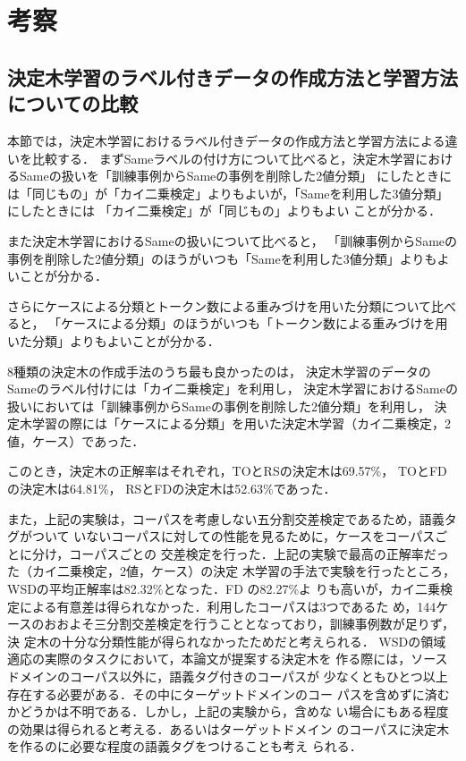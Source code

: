 \documentclass[japanese]{jnlp_1.4}
\begin{document}
\section{考察} \label{Sec:考察}

\subsection{決定木学習のラベル付きデータの作成方法と学習方法についての比較}

本節では，決定木学習におけるラベル付きデータの作成方法と学習方法による違いを比較する．
まずSameラベルの付け方について比べると，決定木学習におけるSameの扱いを「訓練事例からSameの事例を削除した2値分類」
にしたときには「同じもの」が「カイ二乗検定」よりもよいが，「Sameを利用した3値分類」にしたときには
「カイ二乗検定」が「同じもの」よりもよい
ことが分かる．


また決定木学習におけるSameの扱いについて比べると，
「訓練事例からSameの事例を削除した2値分類」のほうがいつも「Sameを利用した3値分類」よりもよいことが分かる．


さらにケースによる分類とトークン数による重みづけを用いた分類について比べると，
「ケースによる分類」のほうがいつも「トークン数による重みづけを用いた分類」よりもよいことが分かる．


8種類の決定木の作成手法のうち最も良かったのは，
決定木学習のデータのSameのラベル付けには「カイ二乗検定」を利用し，
決定木学習におけるSameの扱いにおいては「訓練事例からSameの事例を削除した2値分類」を利用し，
決定木学習の際には「ケースによる分類」を用いた決定木学習（カイ二乗検定，2値，ケース）であった．

このとき，決定木の正解率はそれぞれ，TOとRSの決定木は69.57\%，
TOとFDの決定木は64.81\%，
RSとFDの決定木は52.63\%であった．

また，上記の実験は，コーパスを考慮しない五分割交差検定であるため，語義タグがついて
いないコーパスに対しての性能を見るために，ケースをコーパスごとに分け，コーパスごとの
交差検定を行った．上記の実験で最高の正解率だった（カイ二乗検定，2値，ケース）の決定
木学習の手法で実験を行ったところ，WSDの平均正解率は82.32\%となった．FD の82.27\%よ
りも高いが，カイ二乗検定による有意差は得られなかった．利用したコーパスは3つであるた
め，144ケースのおおよそ三分割交差検定を行うこととなっており，訓練事例数が足りず，決
定木の十分な分類性能が得られなかったためだと考えられる．
WSDの領域適応の実際のタスクにおいて，本論文が提案する決定木を
作る際には，ソースドメインのコーパス以外に，語義タグ付きのコーパスが
少なくともひとつ以上存在する必要がある．その中にターゲットドメインのコー
パスを含めずに済むかどうかは不明である．しかし，上記の実験から，含めな
い場合にもある程度の効果は得られると考える．あるいはターゲットドメイン
のコーパスに決定木を作るのに必要な程度の語義タグをつけることも考え
られる．
\end{document}

